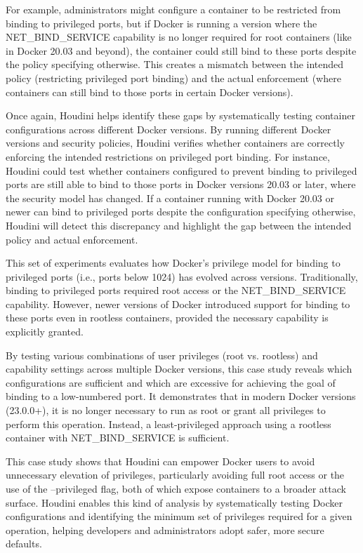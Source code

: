 \documentclass[12pt]{report}
\begin{document}
\begin{doublespace}
For example, administrators might configure a container to be restricted from binding to privileged ports, but if Docker is running a version where the NET\_BIND\_SERVICE capability is no longer required for root containers (like in Docker 20.03 and beyond), the container could still bind to these ports despite the policy specifying otherwise. This creates a mismatch between the intended policy (restricting privileged port binding) and the actual enforcement (where containers can still bind to those ports in certain Docker versions).

Once again, Houdini helps identify these gaps by systematically testing container configurations across different Docker versions. By running different Docker versions and security policies, Houdini verifies whether containers are correctly enforcing the intended restrictions on privileged port binding. For instance, Houdini could test whether containers configured to prevent binding to privileged ports are still able to bind to those ports in Docker versions 20.03 or later, where the security model has changed. If a container running with Docker 20.03 or newer can bind to privileged ports despite the configuration specifying otherwise, Houdini will detect this discrepancy and highlight the gap between the intended policy and actual enforcement.

This set of experiments evaluates how Docker's privilege model for binding to privileged ports (i.e., ports below 1024) has evolved across versions. Traditionally, binding to privileged ports required root access or the NET\_BIND\_SERVICE capability. However, newer versions of Docker introduced support for binding to these ports even in rootless containers, provided the necessary capability is explicitly granted.

By testing various combinations of user privileges (root vs. rootless) and capability settings across multiple Docker versions, this case study reveals which configurations are sufficient and which are excessive for achieving the goal of binding to a low-numbered port. It demonstrates that in modern Docker versions (23.0.0+), it is no longer necessary to run as root or grant all privileges to perform this operation. Instead, a least-privileged approach using a rootless container with NET\_BIND\_SERVICE is sufficient.

This case study shows that Houdini can empower Docker users to avoid unnecessary elevation of privileges, particularly avoiding full root access or the use of the --privileged flag, both of which expose containers to a broader attack surface. Houdini enables this kind of analysis by systematically testing Docker configurations and identifying the minimum set of privileges required for a given operation, helping developers and administrators adopt safer, more secure defaults.


\end{doublespace}
\end{document}
